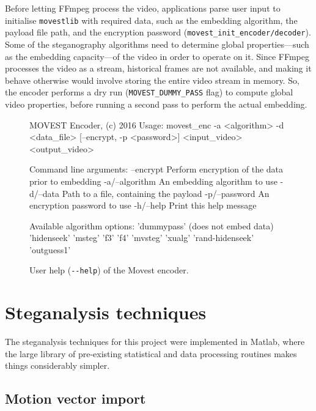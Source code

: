 \documentclass[12pt,british,twoside,notitlepage,usenames,dvipsnames,hypens,final]{report}
\numberwithin{equation}{section}
\numberwithin{figure}{section}
\renewenvironment{alltt}{\vspace{-0.6\baselineskip}\begin{oldalltt}}{\end{oldalltt}\vspace{-0.1\baselineskip}}
\begin{document}
Before letting FFmpeg process the video, applications parse user input to initialise \texttt{movestlib} with required data, such as the embedding algorithm, the payload file path, and the encryption password (\texttt{movest\_init\_encoder/decoder}). Some of the steganography algorithms need to determine global properties---such as the embedding capacity---of the video in order to operate on it. Since FFmpeg processes the video as a stream, historical frames are not available, and making it behave otherwise would involve storing the entire video stream in memory. So, the encoder performs a dry run (\texttt{MOVEST\_DUMMY\_PASS} flag) to compute global video properties, before running a second pass to perform the actual embedding.

\begin{figure}[tbh]
\vspace{1em}
\centering
\begin{minipage}{0.9\textwidth}
\begingroup
    \fontsize{10pt}{12pt}\selectfont
\begin{alltt}
MOVEST Encoder, (c) 2016
Usage: movest_enc -a <algorithm> -d <data_file> [--encrypt, -p <password>]
<input_video> <output_video>

Command line arguments:
 --encrypt        Perform encryption of the data prior to embedding
 -a/--algorithm   An embedding algorithm to use
 -d/--data        Path to a file, containing the payload
 -p/--password    An encryption password to use
 -h/--help        Print this help message

Available algorithm options:
 'dummypass' (does not embed data)
 'hidenseek' 'msteg' 'f3' 'f4'
 'mvsteg' 'xualg'
 'rand-hidenseek' 'outguess1'
\end{alltt}
\endgroup
\end{minipage}
\caption{User help (\texttt{-{}-help}) of the Movest encoder.}
\label{fig:encoder-help}
\end{figure}

\section{Steganalysis techniques}
\label{steg-tech}

The steganalysis techniques for this project were implemented in Matlab, where the large library of pre-existing statistical and data processing routines makes things considerably simpler.

\subsection{Motion vector import}
\label{mv-import}
\end{document}

